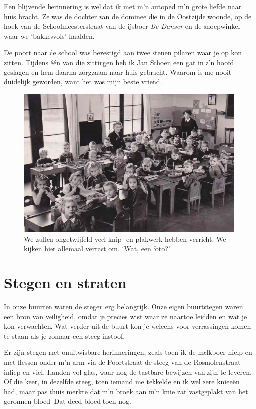 \documentclass[12pt,twoside]{memoir}
\begin{document}
Een blijvende herinnering is wel dat ik met m’n autoped m’n grote liefde naar huis bracht. Ze was de dochter van de dominee die in de Oostzijde woonde, op de hoek van de Schoolmeesterstraat van de ijsboer \emph{De Danser} en de snoepwinkel waar we `bakkesvols' haalden. 

De poort naar de school was bevestigd aan twee stenen pilaren waar je op kon zitten. Tijdens één van die zittingen heb ik Jan Schoen een gat in z’n hoofd geslagen en hem daarna zorgzaam naar huis gebracht. Waarom is me nooit duidelijk geworden, want het was mijn beste vriend. 

\begin{figure}
\includegraphics[width=\textwidth]{img/ch6/kleuterschool2}
\caption*{\footnotesize We zullen ongetwijfeld veel knip- en plakwerk hebben verricht. We kijken hier allemaal verrast om. `Wat, een foto?'}
\end{figure}

\chapter{Stegen en straten} %
\label{cha:stegen_straten}

In onze buurten waren de stegen erg belangrijk. Onze eigen buurtstegen waren een bron van veiligheid, omdat je precies wist waar ze naartoe leidden en wat je kon verwachten. Wat verder uit de buurt kon je weleens voor verrassingen komen te staan als je zomaar een steeg instoof. 

Er zijn stegen met onuitwisbare herinneringen, zoals toen ik de melkboer hielp en met flessen onder m’n arm via de Poortstraat de steeg van de Rosmolenstraat inliep en viel. Handen vol glas, waar nog de tastbare bewijzen van zijn te leveren. Of die keer, in dezelfde steeg, toen iemand me tekkelde en ik wel zere knieeën had, maar pas thuis merkte dat m’n broek aan m’n knie zat vastgeplakt van het geronnen bloed. Dat deed bloed toen nog.
\end{document}
